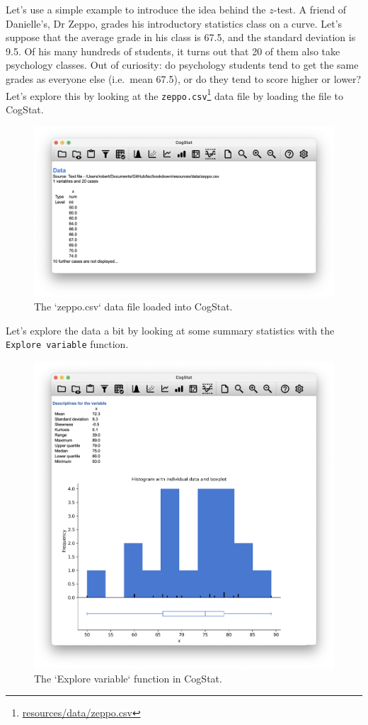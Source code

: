 \documentclass[
  11pt,
  a4paper,
  twoside,symmetric,openright]{book}
\theoremstyle{break}
\theoremstyle{break}
\DeclareRobustCommand{\href}[2]{#2\footnote{\url{#1}}}
\begin{document}
Let's use a simple example to introduce the idea behind the \(z\)-test. A friend of Danielle's, Dr Zeppo, grades his introductory statistics class on a curve. Let's suppose that the average grade in his class is 67.5, and the standard deviation is 9.5. Of his many hundreds of students, it turns out that 20 of them also take psychology classes. Out of curiosity: do psychology students tend to get the same grades as everyone else (i.e.~mean 67.5), or do they tend to score higher or lower? Let's explore this by looking at the \href{resources/data/zeppo.csv}{\texttt{zeppo.csv}} data file by loading the file to CogStat.

\begin{figure}

{\centering \includegraphics[width=0.6\linewidth]{resources/image/cogstatloadzeppo} 

}

\caption{The `zeppo.csv` data file loaded into CogStat.}\label{fig:cogstatloadzeppo}
\end{figure}

Let's explore the data a bit by looking at some summary statistics with the \texttt{Explore\ variable} function.

\begin{figure}

{\centering \includegraphics[width=0.6\linewidth]{resources/image/cogstatexplorezeppo} 

}

\caption{The `Explore variable` function in CogStat.}\label{fig:cogstatexplorezeppo}
\end{figure}
\end{document}
